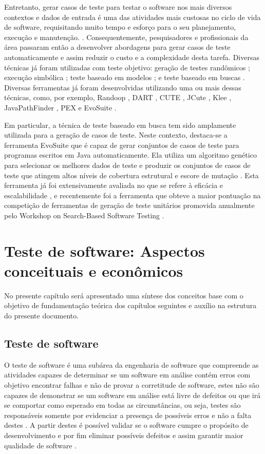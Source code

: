 \documentclass[
	12pt,				%
	oneside,			%
	a4paper,			%
	english,			%
	brazil				%
	]{abntex2ppgsi}
\begin{document}
Entretanto, gerar casos de teste para testar o software nos mais diversos contextos e dados de entrada é uma das atividades mais custosas no ciclo de vida de software, requisitando muito tempo e esforço para o seu planejamento, execução e manutenção. \cite{tahir2014test}. Consequentemente, pesquisadores e profissionais da área passaram então a desenvolver  abordagens para gerar casos de teste automaticamente e assim reduzir o custo e a complexidade desta tarefa. Diversas técnicas já foram utilizadas com teste objetivo: geração de testes randômicos \cite{Pacheco2007}; execução simbólica \cite{Cadar2013}; teste baseado em modelos \cite{dick93}; e teste baseado em buscas \cite{McMinn2004, Harman2012}. Diversas ferramentas já foram desenvolvidas utilizando uma ou mais dessas técnicas, como, por exemplo, Randoop \cite{Pacheco2007}, DART \cite{Godefroid2005}, CUTE \cite{Sen2005}, JCute \cite{Sen2006}, Klee \cite{Cadar2008}, JavaPathFinder \cite{Visser2004}, PEX \cite{Tillmann2008} e EvoSuite \cite{Fraser2011}.

Em particular, a técnica de teste baseado em busca tem sido amplamente utilizada para a geração de casos de teste. Neste contexto, destaca-se a ferramenta EvoSuite que é capaz de gerar conjuntos de casos de teste para programas escritos em Java automaticamente. Ela utiliza um algoritmo genético para selecionar os melhores dados de teste e produzir os conjuntos de casos de teste que atingem altos níveis de cobertura estrutural e escore de mutação \cite{Fraser2011}. Esta ferramenta já foi extensivamente avaliada no que se refere à eficácia e escalabilidade \cite{Fraser2013, Rojas2017, Fraser2015, Fraser2014}, e recentemente foi a ferramenta que obteve a maior pontuação na competição de ferramentas de geração de teste unitários promovida anualmente pelo Workshop on Search-Based Software Testing \cite{Fraser2017}.



\chapter{Teste de software: Aspectos conceituais e econômicos}
No presente capítulo será apresentado uma síntese dos conceitos base com o objetivo de fundamentação teórica dos capítulos seguintes e auxílio na estrutura do presente documento.

\section{Teste de software}
O teste de software é uma subárea da engenharia de software que compreende as atividades capazes de determinar se um software em análise contém erros \cite{gerhart1975} com objetivo encontrar falhas e não de provar a corretitude de software, estes não são capazes de demonstrar se um software em análise está livre de defeitos ou que irá se comportar como esperado em todas as circunstâncias, ou seja, testes são responsáveis somente por evidenciar a presença de possíveis erros e não a falta destes \cite{pfleeger2010}. A partir destes é possível validar se o software cumpre o propósito de desenvolvimento e por fim eliminar possíveis defeitos e assim garantir maior qualidade de software \cite{Sommerville2010}. 
\end{document}
